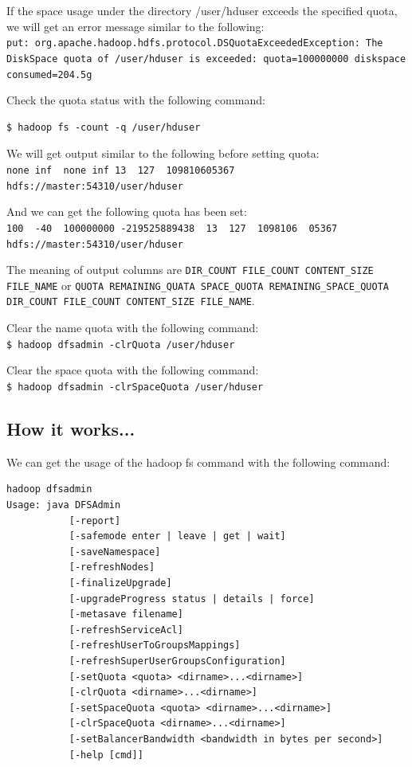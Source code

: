 If the space usage under the directory /user/hduser exceeds the specified quota, we will get an error message similar to the following: \\
\verb|put: org.apache.hadoop.hdfs.protocol.DSQuotaExceededException: The DiskSpace quota of /user/hduser is exceeded: quota=100000000 diskspace consumed=204.5g| 

Check the quota status with the following command:
\begin{verbatim}
$ hadoop fs -count -q /user/hduser
\end{verbatim}

We will get output similar to the following before setting quota: \\
\verb|none inf  none inf 13  127  109810605367 hdfs://master:54310/user/hduser|

And we can get the following quota has been set: \\
\verb|100  -40  100000000 -219525889438  13  127  1098106  05367 hdfs://master:54310/user/hduser| 

The meaning of output columns are \verb|DIR_COUNT FILE_COUNT CONTENT_SIZE FILE_NAME| or \verb|QUOTA REMAINING_QUATA SPACE_QUOTA REMAINING_SPACE_QUOTA DIR_COUNT FILE_COUNT CONTENT_SIZE FILE_NAME|.

Clear the name quota with the following command: \\
\verb|$ hadoop dfsadmin -clrQuota /user/hduser|

Clear the space quota with the following command: \\
\verb|$ hadoop dfsadmin -clrSpaceQuota /user/hduser|

\subsection*{How it works...}
We can get the usage of the hadoop fs command with the following command:
\begin{verbatim}
hadoop dfsadmin
Usage: java DFSAdmin
           [-report]
           [-safemode enter | leave | get | wait]
           [-saveNamespace]
           [-refreshNodes]
           [-finalizeUpgrade]
           [-upgradeProgress status | details | force]
           [-metasave filename]
           [-refreshServiceAcl]
           [-refreshUserToGroupsMappings]
           [-refreshSuperUserGroupsConfiguration]
           [-setQuota <quota> <dirname>...<dirname>]
           [-clrQuota <dirname>...<dirname>]
           [-setSpaceQuota <quota> <dirname>...<dirname>]
           [-clrSpaceQuota <dirname>...<dirname>]
           [-setBalancerBandwidth <bandwidth in bytes per second>]
           [-help [cmd]]
\end{verbatim}

